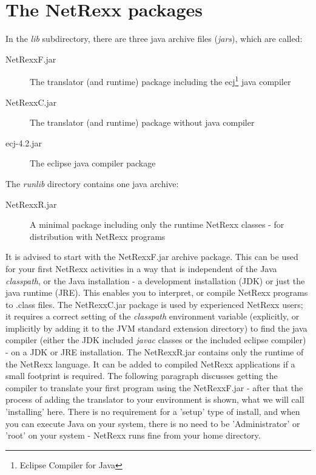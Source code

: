 \section{The NetRexx packages}
In the \emph{lib} subdirectory, there are three java archive files
(\emph{jars}), which are called:

\begin{description}
\item[NetRexxF.jar] The translator (and runtime) package including the
  ecj\footnote{Eclipse Compiler for Java} java compiler
\item[NetRexxC.jar] The translator (and runtime) package without java
  compiler
\item[ecj-4.2.jar] The eclipse java compiler package
\end{description}

The \emph{runlib} directory contains one java archive:
\begin{description}
\item[NetRexxR.jar] A minimal package including only the runtime
  NetRexx classes - for distribution with NetRexx programs
\end{description}
It is advised to start with the NetRexxF.jar archive package. This can
be used for your first NetRexx activities in a way that is independent
of the Java \emph{classpath}, or the Java installation - a development
installation (JDK) or just the java runtime (JRE). This enables you to interpret, or
compile NetRexx programs to .class files. The NetRexxC.jar package is
used by experienced NetRexx users; it requires a correct setting of
the \emph{classpath} environment variable (explicitly, or implicitly
by adding it to the JVM standard extension directory) to find the java
compiler (either the JDK included \emph{javac} classes or the included
eclipse compiler) - on a JDK or JRE installation. The NetRexxR.jar
contains only the runtime of the NetRexx language. It can be added to
compiled NetRexx applications if a small footprint is required. The
following paragraph discusses getting the compiler to translate your
first program using the NetRexxF.jar - after that the process of
adding the translator to your environment is shown, what we will call
'installing' here. There is no requirement for a 'setup' type of
install, and when you can execute Java on your system, there is no
need to be 'Administrator' or 'root' on your system - NetRexx runs
fine from your home directory.

